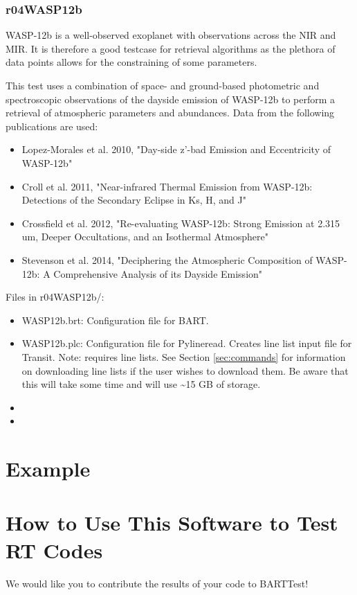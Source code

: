 \documentclass[letterpaper, 12pt]{article}
\begin{document}
\subsubsection{r04WASP12b}
WASP-12b is a well-observed exoplanet with observations across the NIR and MIR. 
It is therefore a good testcase for retrieval algorithms as the plethora of 
data points allows for the constraining of some parameters. 

This test uses a combination of space- and ground-based photometric and 
spectroscopic observations of the 
dayside emission of WASP-12b to perform a retrieval of atmospheric parameters 
and abundances. Data from the following publications are used:
\begin{itemize} \itemsep0pt
  \item Lopez-Morales et al. 2010, "Day-side z'-bad Emission and Eccentricity of WASP-12b"
  \item Croll et al. 2011, "Near-infrared Thermal Emission from WASP-12b: Detections of the Secondary Eclipse in Ks, H, and J"
  \item Crossfield et al. 2012, "Re-evaluating WASP-12b: Strong Emission at 2.315 um, Deeper Occultations, and an Isothermal Atmosphere"
  \item Stevenson et al. 2014, "Deciphering the Atmospheric Composition of WASP-12b: A Comprehensive Analysis of its Dayside Emission"
\end{itemize}

Files in r04WASP12b/:
\begin{itemize} \itemsep0pt
  \item WASP12b.brt: Configuration file for BART.
  \item WASP12b.plc: Configuration file for Pylineread. Creates 
        line list input file for Transit. Note: requires line lists. See 
        Section \ref{sec:commands} for information on downloading line lists if 
        the user wishes to download them. Be aware that this will take some 
        time and will use {\sim}15 GB of storage.
  \item 
  \item 
\end{itemize}

\section{Example}
\label{sec:example}


\section{How to Use This Software to Test RT Codes}
\label{sec:howto}
We would like you to contribute the results of your code to BARTTest! 
\end{document}
